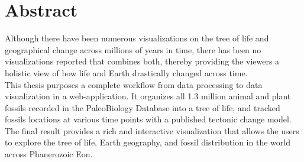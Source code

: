 
\chapter{Abstract} \label{chp:abstract}

Although there have been numerous visualizations on the tree of life and geographical change across millions of years in time, there has been no visualizations reported that combines both, thereby providing the viewers a holistic view of how life and Earth drastically changed across time. \\

This thesis purposes a complete workflow from data processing to data visualization in a web-application. It organizes all 1.3 million animal and plant fossils recorded in the PaleoBiology Database into a tree of life, and tracked fossils locations at various time points with a published tectonic change model. The final result provides a rich and interactive visualization that allows the users to explore the tree of life, Earth geography, and fossil distribution in the world across Phanerozoic Eon. 

